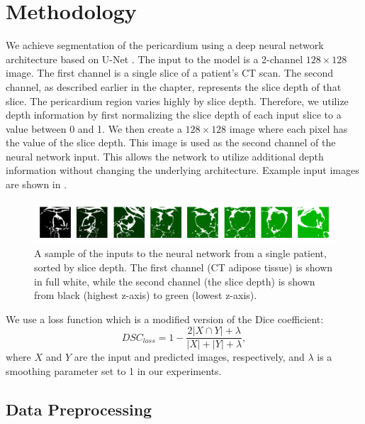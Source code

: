 \section{Methodology}\label{method}

We achieve segmentation of the pericardium using a deep neural network architecture based on U-Net \cite{ronneberger2015unet}. The input to the model is a 2-channel $128 \times 128$ image. The first channel is a single slice of a patient's CT scan. The second channel, as described earlier in the chapter, represents the slice depth of that slice. The pericardium region varies highly by slice depth. Therefore, we utilize depth information by first normalizing the slice depth of each input slice to a value between 0 and 1. We then create a $128 \times 128$ image where each pixel has the value of the slice depth. This image is used as the second channel of the neural network input. This allows the network to utilize additional depth information without changing the underlying architecture. Example input images are shown in .

\begin{figure}[b]
\center
\includegraphics[width=\columnwidth]{images/6/inputs.png}
\caption{A sample of the inputs to the neural network from a single patient, sorted by slice depth. The first channel (CT adipose tissue) is shown in full white, while the second channel (the slice depth) is shown from black (highest z-axis) to green (lowest z-axis). \cite{bencevicEpicardialAdiposeTissue2021}}
\label{fig:input-images}
\end{figure}

We use a loss function which is a modified version of the Dice coefficient:
  \begin{equation}
    \textit{DSC}_{loss} = 1 - \frac {2 \lvert X\cap Y \rvert + \lambda}{\lvert X \rvert + \lvert Y \rvert + \lambda},
    \label{eq:loss}
  \end{equation}
where $X$ and $Y$ are the input and predicted images, respectively, and $\lambda$ is a smoothing parameter set to 1 in our experiments.

\subsection{Data Preprocessing}

